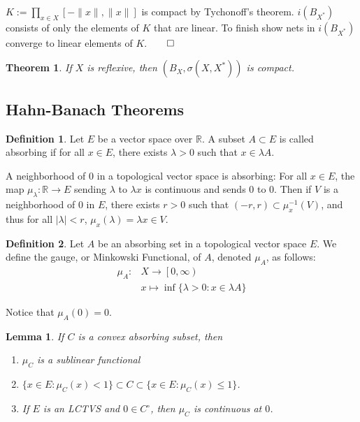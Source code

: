 \documentclass[11pt, reqno]{article}
\theoremstyle{plain}
\newtheorem*{theorem}{Theorem}
\newtheorem*{lemma}{Lemma}
\theoremstyle{definition}
\newtheorem*{definition}{Definition}
\theoremstyle{remark}
\newcommand{\RR}{\mathbb{R}}
\begin{document}
$K := \prod_{x \in X} [-\|x\|, \|x\|]$ is compact by Tychonoff's theorem. $i(B_{X^*})$ consists of only the elements
of $K$ that are linear. To finish show nets in $i(B_{X^*})$ converge to linear elements of $K$.\hfill $\qed$

\begin{theorem}
    If $X$ is reflexive, then $(B_X, \sigma(X, X^*))$ is compact. 
\end{theorem}

\subsection*{Hahn-Banach Theorems}

\begin{definition}
    Let $E$ be a vector space over $\RR$. A subset $A \subset E$ is called absorbing if for all $x \in E$, there
    exists $\lambda > 0$ such that $x \in \lambda A$.
\end{definition}

A neighborhood of $0$ in a topological vector space is absorbing: For all $x \in E$, the map
$\mu_\lambda: \RR \rightarrow E$ sending $\lambda$ to $\lambda x$ is continuous
and sends $0$ to $0$. Then if $V$ is a neighborhood of $0$ in $E$, there exists
$r > 0$ such that $(-r, r) \subset \mu_x^{-1}(V)$, and thus for all $|\lambda| < r$,
$\mu_x(\lambda) = \lambda x \in V$. 

\begin{definition}
    Let $A$ be an absorbing set in a topological vector space $E$. We define the 
    gauge, or Minkowski Functional, of $A$, denoted $\mu_A$, as follows:
    \begin{align*}
        \mu_A: & X \rightarrow \left[0,\infty\right) \\
        & x \mapsto \inf\{\lambda > 0: x \in \lambda A\}
    \end{align*}
\end{definition}

Notice that $\mu_A(0) = 0$. 

\begin{lemma}
    If $C$ is a convex absorbing subset, then 
    \begin{enumerate}
        \item[i.] $\mu_C$ is a sublinear functional 
        \item[ii.] $\{x \in E: \mu_C(x) < 1\} \subset C \subset \{x \in E: \mu_C(x) \leq 1\}$.
        \item[iii.] If $E$ is an LCTVS and $0 \in C^\circ$, then $\mu_C$ is continuous at $0$. 
    \end{enumerate}
\end{lemma}
\end{document}
